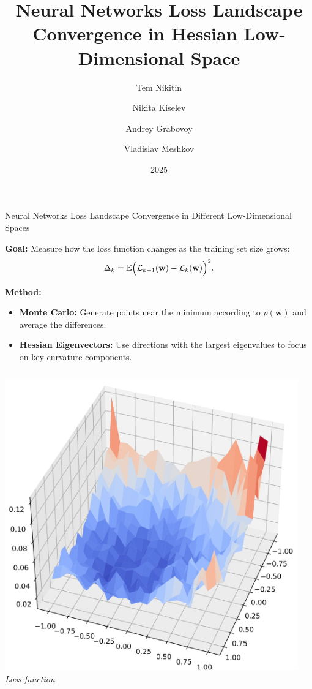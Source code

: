 \documentclass[10pt]{beamer}
\title[Loss Landscape Convergence]{Neural Networks Loss Landscape Convergence in Hessian Low-Dimensional Space}
\author[Tem Nikitin \textit{et al.}]{Tem Nikitin \and Nikita Kiselev \and Andrey Grabovoy \and Vladislav Meshkov}
\institute{Moscow Institute of Physics and Technology}
\date{2025}
\begin{document}
\begin{frame}{Neural Networks Loss Landscape Convergence in Different Low-Dimensional Spaces}

    \textbf{Goal:} Measure how the loss function changes as the training set size grows:
    $$
        \Delta_k =
        \mathbb{E} \Bigl( \mathcal{L}_{k+1} (\mathbf{w}) - \mathcal{L}_{k} (\mathbf{w}) \Bigr)^2.
    $$

    \textbf{Method:}
    \begin{itemize}
        \item \textbf{Monte Carlo:} Generate points near the minimum according to $p(\mathbf{w})$ and average the differences.
        \item \textbf{Hessian Eigenvectors:} Use directions with the largest eigenvalues to focus on key curvature components.
    \end{itemize}

    \begin{columns}[t]
        \centering
        \hspace*{-2cm}
        \includegraphics[width=0.95\textwidth]{img/LS_16.jpg}\\
        \hspace*{-2cm}
        \scriptsize \textit{Loss function}


\end{columns}
\end{frame}
\end{document}
